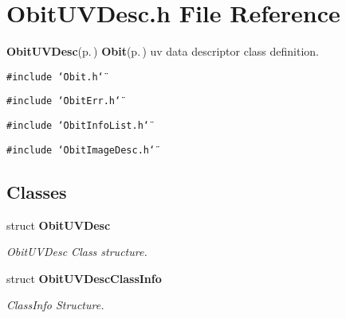 \section{Obit\-UVDesc.h File Reference}
\label{ObitUVDesc_8h}
{\bf Obit\-UVDesc}{\rm (p.\,\pageref{structObitUVDesc})} {\bf Obit}{\rm (p.\,\pageref{structObit})} uv data descriptor class definition. 

{\tt \#include \char`\"{}Obit.h\char`\"{}}\par
{\tt \#include \char`\"{}Obit\-Err.h\char`\"{}}\par
{\tt \#include \char`\"{}Obit\-Info\-List.h\char`\"{}}\par
{\tt \#include \char`\"{}Obit\-Image\-Desc.h\char`\"{}}\par
\subsection*{Classes}
\begin{CompactItemize}
\item 
struct {\bf Obit\-UVDesc}
\begin{CompactList}\small\item\em Obit\-UVDesc Class structure. \item\end{CompactList}\item 
struct {\bf Obit\-UVDesc\-Class\-Info}
\begin{CompactList}\small\item\em Class\-Info Structure. \item\end{CompactList}\end{CompactItemize}
